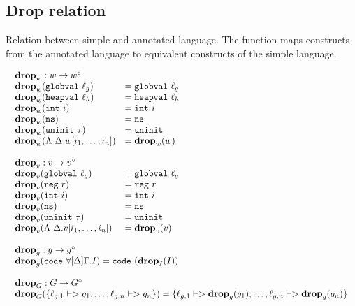\subsection{Drop relation}

Relation between simple and annotated language. The function maps constructs
from the annotated language to equivalent constructs of the simple language.

{\footnotesize
\[\begin{array}{l}
\begin{array}{ll}
\rlap{$\mathbf{drop}_w : w -> w^\circ$} \\
\drop{w}{\mathtt{globval}\ \ell_g} &= \mathtt{globval}\ \ell_g \\
\drop{w}{\mathtt{heapval}\ \ell_h} &= \mathtt{heapval}\ \ell_h \\
\drop{w}{\mathtt{int}\ i} &= \mathtt{int}\ i \\
\drop{w}{\mathtt{ns}} &= \mathtt{ns} \\
\drop{w}{\mathtt{uninit}\ \tau} &= \mathtt{uninit} \\
\drop{w}{\Lambda\ \Delta.w[i_1, \dots, i_n]} &= \drop{w}{w} \\\\

\rlap{$\mathbf{drop}_v : v -> v^\circ$} \\
\drop{v}{\mathtt{globval}\ \ell_g} &= \mathtt{globval}\ \ell_g \\
\drop{v}{\mathtt{reg}\ r} &= \mathtt{reg}\ r \\
\drop{v}{\mathtt{int}\ i} &= \mathtt{int}\ i \\
\drop{v}{\mathtt{ns}} &= \mathtt{ns} \\
\drop{v}{\mathtt{uninit}\ \tau} &= \mathtt{uninit} \\
\drop{v}{\Lambda\ \Delta.v[i_1, \dots, i_n]} &= \drop{v}{v}
\end{array} \\\\

\begin{array}{l}
\mathbf{drop}_g : g -> g^\circ \\
\drop{g}{\mathtt{code}\ \forall[\Delta]\Gamma.I} = \mathtt{code}\ (\drop{I}{I}) \\\\

\mathbf{drop}_G : G -> G^\circ \\
\drop{G}{\{\ell_{g,1} |-> g_1, \dots, \ell_{g,n} |-> g_n\}} = \{\ell_{g,1} |-> \drop{g}{g_1}, \dots, \ell_{g,n} |-> \drop{g}{g_n}\} \\\\


\end{array}
\end{array}\]}
